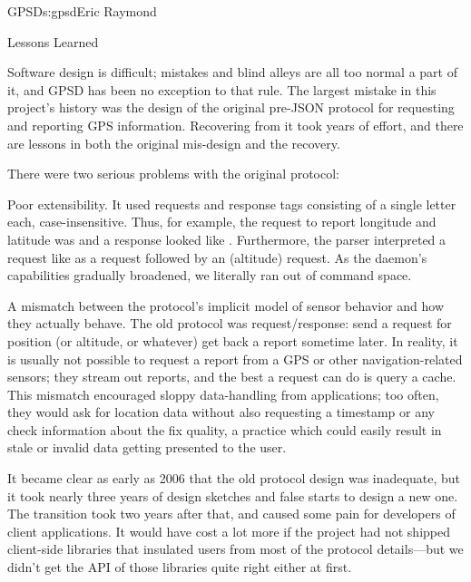 \begin{aosachapter}{GPSD}{s:gpsd}{Eric Raymond}
\begin{aosasect1}{Lessons Learned}

Software design is difficult; mistakes and blind alleys are all too
normal a part of it, and GPSD has been no exception to that rule.  The
largest mistake in this project's history was the design of the
original pre-JSON protocol for requesting and reporting GPS
information.  Recovering from it took years of effort, and there are
lessons in both the original mis-design and the recovery.

There were two serious problems with the original protocol:

\begin{aosaenumerate}

  \item Poor extensibility.  It used requests and response tags
    consisting of a single letter each, case-insensitive. Thus, for
    example, the request to report longitude and latitude was
     and a response looked like . 
    Furthermore, the parser interpreted a request like
     as a  request followed by an 
    (altitude) request.  As the daemon's capabilities gradually
    broadened, we literally ran out of command space.

  \item A mismatch between the protocol's implicit model of sensor
    behavior and how they actually behave.  The old protocol was
    request/response: send a request for position (or altitude, or
    whatever) get back a report sometime later. In reality, it is
    usually not possible to request a report from a GPS or other
    navigation-related sensors; they stream out reports, and the best
    a request can do is query a cache.  This mismatch encouraged
    sloppy data-handling from applications; too often, they would ask
    for location data without also requesting a timestamp or any check
    information about the fix quality, a practice which could easily
    result in stale or invalid data getting presented to the user.

\end{aosaenumerate}

It became clear as early as 2006 that the old protocol design was
inadequate, but it took nearly three years of design sketches and 
false starts to design a new one.  The transition took two years
after that, and caused some pain for developers of client applications.
It would have cost a lot more if the project had not shipped client-side
libraries that insulated users from most of the protocol details---but
we didn't get the API of those libraries quite right either at first.


\end{aosasect1}
\end{aosachapter}
